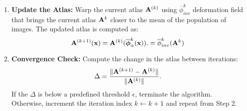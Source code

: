 \begin{enumerate}
    \item \textbf{Update the Atlas:} Warp the current atlas \( \mathbf{A}^{(k)} \) using \(\overline{\phi}_{inv}^{k}\) deformation field that brings the current atlas \(\mathbf{A}^{k}\) closer to the mean of the population of images. The updated atlas is computed as:
    \[
    \mathbf{A}^{(k+1)}(\mathbf{x}) = \mathbf{A}^{(k)}(\overline{{\boldsymbol{\phi}}}^{k}_{\alpha}(\mathbf{x})). = \overline{\phi}_{inv}^{k} ( \mathbf{A}^{k})
    \]

    \item \textbf{Convergence Check:} Compute the change in the atlas between iterations:
    \[
    \Delta = \frac{\|\mathbf{A}^{(k+1)} - \mathbf{A}^{(k)}\|}{\|\mathbf{A}^{(k)}\|}.
    \]
    If the \(\Delta\) is below a predefined threshold \( \epsilon \), terminate the algorithm. Otherwise, increment the iteration index \( k \leftarrow k + 1 \) and repeat from Step 2.
\end{enumerate}

